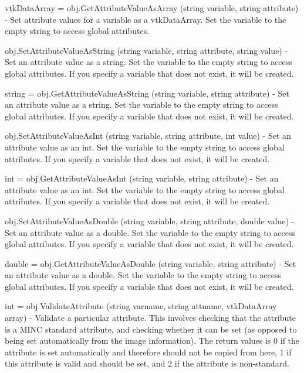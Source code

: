 \begin{DoxyItemize}
\item {\ttfamily vtk\-Data\-Array = obj.\-Get\-Attribute\-Value\-As\-Array (string variable, string attribute)} -\/ Set attribute values for a variable as a vtk\-Data\-Array. Set the variable to the empty string to access global attributes.  
\item {\ttfamily obj.\-Set\-Attribute\-Value\-As\-String (string variable, string attribute, string value)} -\/ Set an attribute value as a string. Set the variable to the empty string to access global attributes. If you specify a variable that does not exist, it will be created.  
\item {\ttfamily string = obj.\-Get\-Attribute\-Value\-As\-String (string variable, string attribute)} -\/ Set an attribute value as a string. Set the variable to the empty string to access global attributes. If you specify a variable that does not exist, it will be created.  
\item {\ttfamily obj.\-Set\-Attribute\-Value\-As\-Int (string variable, string attribute, int value)} -\/ Set an attribute value as an int. Set the variable to the empty string to access global attributes. If you specify a variable that does not exist, it will be created.  
\item {\ttfamily int = obj.\-Get\-Attribute\-Value\-As\-Int (string variable, string attribute)} -\/ Set an attribute value as an int. Set the variable to the empty string to access global attributes. If you specify a variable that does not exist, it will be created.  
\item {\ttfamily obj.\-Set\-Attribute\-Value\-As\-Double (string variable, string attribute, double value)} -\/ Set an attribute value as a double. Set the variable to the empty string to access global attributes. If you specify a variable that does not exist, it will be created.  
\item {\ttfamily double = obj.\-Get\-Attribute\-Value\-As\-Double (string variable, string attribute)} -\/ Set an attribute value as a double. Set the variable to the empty string to access global attributes. If you specify a variable that does not exist, it will be created.  
\item {\ttfamily int = obj.\-Validate\-Attribute (string varname, string attname, vtk\-Data\-Array array)} -\/ Validate a particular attribute. This involves checking that the attribute is a M\-I\-N\-C standard attribute, and checking whether it can be set (as opposed to being set automatically from the image information). The return values is 0 if the attribute is set automatically and therefore should not be copied from here, 1 if this attribute is valid and should be set, and 2 if the attribute is non-\/standard.  

\end{DoxyItemize}
